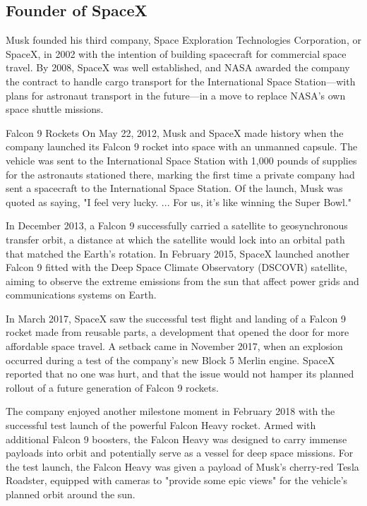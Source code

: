 \documentclass{article}                    %
\begin{document}
\subsection{Founder of SpaceX}                        %
Musk founded his third company, Space Exploration Technologies Corporation, or SpaceX, in 2002 with the intention of building spacecraft for commercial space travel. By 2008, SpaceX was well established, and NASA awarded the company the contract to handle cargo transport for the International Space Station—with plans for astronaut transport in the future—in a move to replace NASA’s own space shuttle missions.

Falcon 9 Rockets
On May 22, 2012, Musk and SpaceX made history when the company launched its Falcon 9 rocket into space with an unmanned capsule. The vehicle was sent to the International Space Station with 1,000 pounds of supplies for the astronauts stationed there, marking the first time a private company had sent a spacecraft to the International Space Station. Of the launch, Musk was quoted as saying, "I feel very lucky. ... For us, it's like winning the Super Bowl."

In December 2013, a Falcon 9 successfully carried a satellite to geosynchronous transfer orbit, a distance at which the satellite would lock into an orbital path that matched the Earth's rotation. In February 2015, SpaceX launched another Falcon 9 fitted with the Deep Space Climate Observatory (DSCOVR) satellite, aiming to observe the extreme emissions from the sun that affect power grids and communications systems on Earth.

In March 2017, SpaceX saw the successful test flight and landing of a Falcon 9 rocket made from reusable parts, a development that opened the door for more affordable space travel. A setback came in November 2017, when an explosion occurred during a test of the company's new Block 5 Merlin engine. SpaceX reported that no one was hurt, and that the issue would not hamper its planned rollout of a future generation of Falcon 9 rockets.

The company enjoyed another milestone moment in February 2018 with the successful test launch of the powerful Falcon Heavy rocket. Armed with additional Falcon 9 boosters, the Falcon Heavy was designed to carry immense payloads into orbit and potentially serve as a vessel for deep space missions. For the test launch, the Falcon Heavy was given a payload of Musk's cherry-red Tesla Roadster, equipped with cameras to "provide some epic views" for the vehicle's planned orbit around the sun. 
\end{document}
